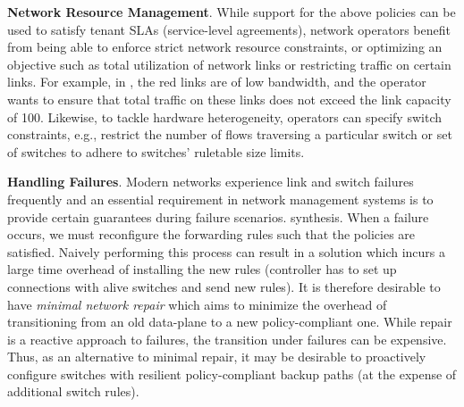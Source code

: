 \begin{compactitemize}
\item \textbf{Network Resource Management}. While support for the
  above policies can be used to satisfy tenant SLAs (service-level
  agreements), network operators benefit from being able to enforce
  strict network resource constraints, or optimizing an objective such
  as total utilization of network links or restricting traffic on
  certain links. For example, in , the red
  links are of low bandwidth, and the operator wants to ensure that
  total traffic on these links does not exceed the link capacity of 100.
  Likewise, to tackle hardware heterogeneity, operators can specify
  switch constraints, e.g., restrict the number of flows traversing a
  particular switch or set of switches to adhere to switches'
  ruletable size limits.
  
 
 \item \textbf{Handling Failures}. Modern networks experience link and switch failures
 frequently and an essential requirement in network management systems is to
 provide certain guarantees during failure scenarios. 
 synthesis.  When a failure occurs, we must reconfigure the forwarding
 rules such that the policies are satisfied. Naively performing this
 process can result in a solution which incurs a large time overhead
 of installing the new rules (controller has to set up connections
 with alive switches and send new rules). It is therefore desirable to
 have {\em minimal network repair} which aims to minimize the overhead of
 transitioning from an old data-plane to a new policy-compliant
 one. While repair is a reactive approach to failures, the transition
 under failures can be expensive. Thus, as an alternative to minimal
 repair, it may be desirable to proactively configure switches with
 resilient policy-compliant backup paths (at the expense of additional
 switch rules).
\end{compactitemize}


